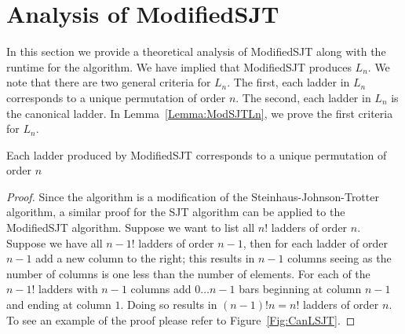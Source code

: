 {\section{Analysis of {\sc ModifiedSJT}}
In this section we provide a theoretical analysis of {\sc ModifiedSJT} along with the runtime for the algorithm. 
We have implied that {\sc ModifiedSJT} produces $L_{n}$. 
We note that there are two general criteria for $L_{n}$. The first, each ladder in $L_{n}$ corresponds to a 
unique permutation of order $n$. The second, each ladder in $L_{n}$ is the canonical ladder. In Lemma~\ref{Lemma:ModSJTLn}, 
we prove the first criteria for $L_{n}$. 
\begin{lemma}
  Each ladder produced by {\sc ModifiedSJT} corresponds to a unique permutation of order $n$
  \label{Lemma:ModSJTLn}
\end{lemma}
\begin{proof}
  Since the algorithm is a modification of the Steinhaus-Johnson-Trotter algorithm, a similar proof for the SJT algorithm 
can be applied to the {\sc ModifiedSJT} algorithm. Suppose we want to list all $n!$ ladders 
of order $n$. Suppose we have all $n-1!$ ladders of order $n-1$, then for 
each ladder of order $n-1$ add a new column to the right; this results in $n-1$ columns seeing as 
the number of columns is one less than the number of elements. For each of the $n-1!$ ladders with $n-1$ columns 
add $0 \dots n-1$ bars beginning at column $n-1$ and ending 
at column $1$. Doing so results in $(n-1)!n=n!$ ladders of order $n$. To see 
an example of the proof please refer to Figure~\ref{Fig:CanLSJT}.
\end{proof}

\begin{center}
\begin{figure}[!htp]
  \centering
\end{figure}
\end{center}}
